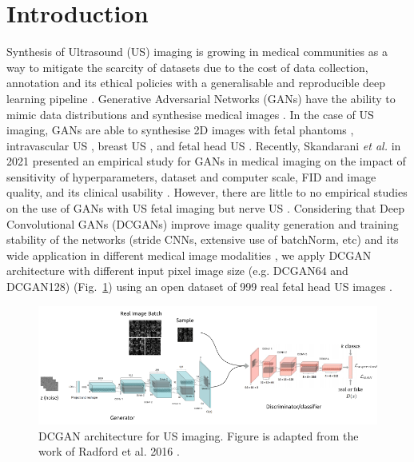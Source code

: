 \documentclass[runningheads]{llncs}
\begin{document}
\section{Introduction}
Synthesis of Ultrasound (US) imaging is growing in medical communities as a way to mitigate the scarcity of datasets due to the cost of data collection, annotation and its ethical policies with a generalisable and reproducible deep learning pipeline \cite{fiorentino2022-DLUSFetalImaging}.
Generative Adversarial Networks (GANs) have the ability to mimic data distributions and synthesise medical images \cite{KAZEMINIA2020gans, skandarani2021gans}.
In the case of US imaging, GANs are able to synthesise 2D images with fetal phantoms \cite{hu2017-gans-us}, intravascular US \cite{tom-gans-us}, breast US \cite{fujioka2019-gans-us}, and fetal head US \cite{lee2022-gans-us}.
Recently, Skandarani \textit{et al.} in 2021 presented an empirical study for GANs in medical imaging on the impact of sensitivity of hyperparameters, dataset and computer scale, FID and image quality, and its clinical usability \cite{skandarani2021gans}.
However, there are little to no empirical studies on the use of GANs with US fetal imaging but nerve US \cite{kumar2021empirical}.
Considering that Deep Convolutional GANs (DCGANs) improve image quality generation and training stability of the networks (stride CNNs, extensive use of batchNorm, etc) \cite{radford2016unsupervised} and its wide application in different medical image modalities \cite{radford2016unsupervised,KAZEMINIA2020gans, skandarani2021gans, fujioka2019-gans-us}, we apply DCGAN architecture \cite{radford2016unsupervised} with different input pixel image size (e.g. DCGAN64 and DCGAN128) (Fig.~\ref{fig1}) using an open dataset of 999 real fetal head US images \cite{vandenHeuvel2018}.

\begin{figure}
\includegraphics[width=\textwidth]{fig01.png} %
\caption{DCGAN architecture for US imaging. Figure is adapted from the work of Radford et al. 2016 \cite{radford2016unsupervised}.} \label{fig1}
\end{figure}
\end{document}

